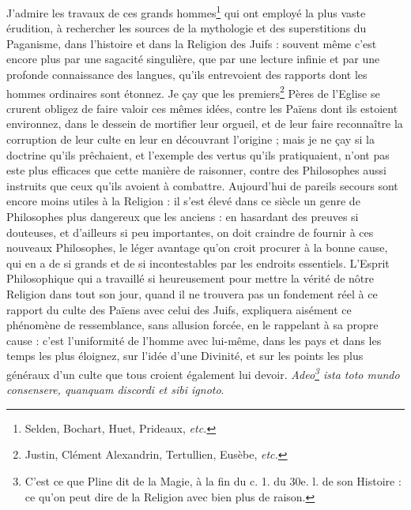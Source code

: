 \documentclass[a4paper, 11pt, oneside, polutonikogreek, french, landscape]{article}
\begin{document}
J'admire les travaux de ces grands hommes\footnote{Selden, Bochart, Huet, Prideaux, \emph{etc.}} qui ont employé la plus vaste érudition, à rechercher les sources de la mythologie et des superstitions du Paganisme, dans l'histoire et dans la Religion des Juifs : souvent même c'est encore plus par une sagacité singulière, que par une lecture infinie et par une profonde connaissance des langues, qu'ils entrevoient des rapports dont les hommes ordinaires sont étonnez. Je çay que les premiers\footnote{Justin, Clément Alexandrin, Tertullien, Eusèbe, \emph{etc.}} Pères de l'Eglise se crurent obligez de faire valoir ces mêmes idées, contre les Païens dont ils estoient environnez, dans le dessein de mortifier leur orgueil, et de leur faire reconnaître la corruption de leur culte en leur en découvrant l'origine ; mais je ne çay si la doctrine qu'ils prêchaient, et l'exemple des vertus qu'ils pratiquaient, n'ont pas este plus efficaces que cette manière de raisonner, contre des Philosophes aussi instruits que ceux qu'ils avoient à combattre. Aujourd’hui de pareils secours sont encore moins utiles à la Religion : il s'est élevé dans ce siècle un genre de Philosophes plus dangereux que les anciens : en hasardant des preuves si douteuses, et d'ailleurs si peu importantes, on doit craindre de fournir à ces nouveaux Philosophes, le léger avantage qu'on croit procurer à la bonne cause, qui en a de si grands et de si incontestables par les endroits essentiels. L'Esprit Philosophique qui a travaillé si heureusement pour mettre la vérité de nôtre Religion dans tout son jour, quand il ne trouvera pas un fondement réel à ce rapport du culte des Païens avec celui des Juifs, expliquera aisément ce phénomène de ressemblance, sans allusion forcée, en le rappelant à sa propre cause : c'est l'uniformité de l'homme avec lui-même, dans les pays et dans les temps les plus éloignez, sur l'idée d'une Divinité, et sur les points les plus généraux d'un culte que tous croient également lui devoir. \emph{Adeo\footnote{C'est ce que Pline dit de la Magie, à la fin du c. 1. du 30e. l. de son Histoire : ce qu'on peut dire de la Religion avec bien plus de raison.} ista toto mundo consensere, quanquam discordi et sibi ignoto}.
\end{document}
